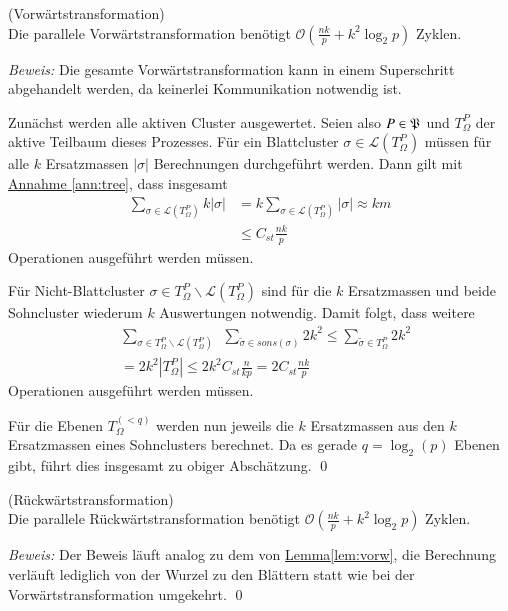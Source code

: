   \begin{lem}
  \label{lem:vorw}
    (Vorwärtstransformation)\\
    Die parallele Vorwärtstransformation benötigt $\mathcal{O}(\frac{nk}{p}+k^2 \log_2p)$ Zyklen.
  \end{lem}
  
  \textit{Beweis:} 
  Die gesamte Vorwärtstransformation kann in einem Superschritt abgehandelt werden, da keinerlei Kommunikation notwendig ist. 
  
  Zunächst werden alle aktiven Cluster ausgewertet. Seien also $P \in \mathfrak{P}$ und $T_\Omega^P$ der aktive Teilbaum dieses Prozesses. Für ein Blattcluster $\sigma \in \mathcal{L}(T_\Omega^P)$ müssen 
  für alle $k$ Ersatzmassen $|\sigma|$ Berechnungen durchgeführt werden.  
  Dann gilt  mit \hyperref[ann:tree]{Annahme }\ref{ann:tree}, dass insgesamt
  \begin{align*}
    \sum_{\sigma \in \mathcal{L}(T_\Omega^P)} k|\sigma| &= k\sum_{\sigma \in \mathcal{L}(T_\Omega^P)} |\sigma| \approx k m\\
    &\leq C_{st}\frac{nk}{p}
  \end{align*}
  Operationen ausgeführt werden müssen.
  
  Für Nicht-Blattcluster $\sigma \in T_\Omega^P \backslash \mathcal{L}(T_\Omega^P)$ sind für die $k$ Ersatzmassen und beide Sohncluster wiederum $k$ Auswertungen notwendig. Damit folgt, dass weitere
  \begin{align*}
    &\sum_{\sigma \in T_\Omega^P \backslash \mathcal{L}(T_\Omega^P)} \ \ \sum_{\tilde \sigma \in sons(\sigma)} 2k^2 \leq \sum_{\tilde \sigma \in T_\Omega^P} 2k^2\\
    &= 2k^2 |T_\Omega^P| \leq 2k^2 C_{st} \frac{n}{kp} = 2C_{st}\frac{nk}{p}
  \end{align*}
  Operationen ausgeführt werden müssen.
  
  Für die Ebenen $T_\Omega^{(<q)}$ werden nun jeweils die $k$ Ersatzmassen aus den $k$ Ersatzmassen eines Sohnclusters berechnet. Da es gerade $q = \log_2(p)$ Ebenen gibt, führt dies insgesamt zu obiger
  Abschätzung. \qed
  
  \begin{lem}
  \label{lem:ruckw}
    (Rückwärtstransformation)\\
    Die parallele Rückwärtstransformation benötigt $\mathcal{O}(\frac{nk}{p}+k^2 \log_2p)$ Zyklen.
  \end{lem}
  
  \textit{Beweis:}
  Der Beweis läuft analog zu dem von \hyperref[lem:vorw]{Lemma}\autoref{lem:vorw}, die Berechnung verläuft lediglich von der Wurzel zu den Blättern statt wie bei der Vorwärtstransformation umgekehrt. \qed
  
